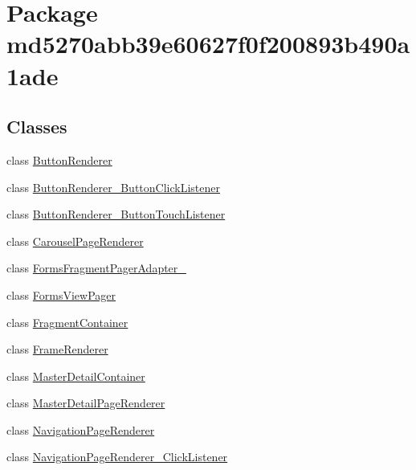 \hypertarget{namespacemd5270abb39e60627f0f200893b490a1ade}{
\section{Package md5270abb39e60627f0f200893b490a1ade}
\label{namespacemd5270abb39e60627f0f200893b490a1ade}
}
\subsection*{Classes}
\begin{CompactItemize}
\item 
class \hyperlink{classmd5270abb39e60627f0f200893b490a1ade_1_1_button_renderer}{ButtonRenderer}
\item 
class \hyperlink{classmd5270abb39e60627f0f200893b490a1ade_1_1_button_renderer___button_click_listener}{ButtonRenderer\_\-ButtonClickListener}
\item 
class \hyperlink{classmd5270abb39e60627f0f200893b490a1ade_1_1_button_renderer___button_touch_listener}{ButtonRenderer\_\-ButtonTouchListener}
\item 
class \hyperlink{classmd5270abb39e60627f0f200893b490a1ade_1_1_carousel_page_renderer}{CarouselPageRenderer}
\item 
class \hyperlink{classmd5270abb39e60627f0f200893b490a1ade_1_1_forms_fragment_pager_adapter__1}{FormsFragmentPagerAdapter\_}
\item 
class \hyperlink{classmd5270abb39e60627f0f200893b490a1ade_1_1_forms_view_pager}{FormsViewPager}
\item 
class \hyperlink{classmd5270abb39e60627f0f200893b490a1ade_1_1_fragment_container}{FragmentContainer}
\item 
class \hyperlink{classmd5270abb39e60627f0f200893b490a1ade_1_1_frame_renderer}{FrameRenderer}
\item 
class \hyperlink{classmd5270abb39e60627f0f200893b490a1ade_1_1_master_detail_container}{MasterDetailContainer}
\item 
class \hyperlink{classmd5270abb39e60627f0f200893b490a1ade_1_1_master_detail_page_renderer}{MasterDetailPageRenderer}
\item 
class \hyperlink{classmd5270abb39e60627f0f200893b490a1ade_1_1_navigation_page_renderer}{NavigationPageRenderer}
\item 
class \hyperlink{classmd5270abb39e60627f0f200893b490a1ade_1_1_navigation_page_renderer___click_listener}{NavigationPageRenderer\_\-ClickListener}

\end{CompactItemize}

